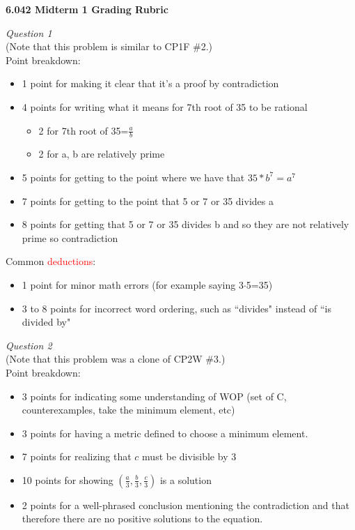 \documentclass[12pt]{article}
\begin{document}
\noindent
\textbf{6.042 Midterm 1 Grading Rubric}

\noindent
\emph{Question 1}\\
(Note that this problem is similar to CP1F \#2.)\\
Point breakdown:
\begin{itemize}
\item 1 point for making it clear that it's a proof by contradiction
\item 4 points for writing what it means for 7th root of 35 to be rational
	\begin{itemize}
	\item 2 for 7th root of 35=$\frac{a}{b} $
	\item 2 for a, b are relatively prime
	\end{itemize}
\item 5 points for getting to the point where we have that $35*b^7=a^7$
\item 7 points for getting to the point that 5 or 7 or 35 divides a
\item 8 points for getting that 5 or 7 or 35 divides b and so they are not relatively prime so contradiction
\end{itemize}
\noindent
Common \textcolor{red}{deductions}:
\begin{itemize}
\item 1 point for minor math errors (for example saying 3$\cdot$5=35)
\item 3 to 8 points for incorrect word ordering, such as ``divides" instead of ``is divided by"
\end{itemize}

\noindent
\emph{Question 2}\\
(Note that this problem was a clone of CP2W \#3.)\\
Point breakdown:
\begin{itemize}
\item 3 points for indicating some understanding of WOP (set of C, counterexamples, take the minimum element, etc) 
\item 3 points for having a metric defined to choose a minimum element.
\item 7 points for realizing that $c$ must be divisible by 3
\item 10 points for showing $(\frac{a}{3}, \frac{b}{3}, \frac{c}{3})$ is a solution
\item 2 points for a well-phrased conclusion mentioning the contradiction and that therefore there are no positive solutions to the equation.
\end{itemize}
\end{document}

